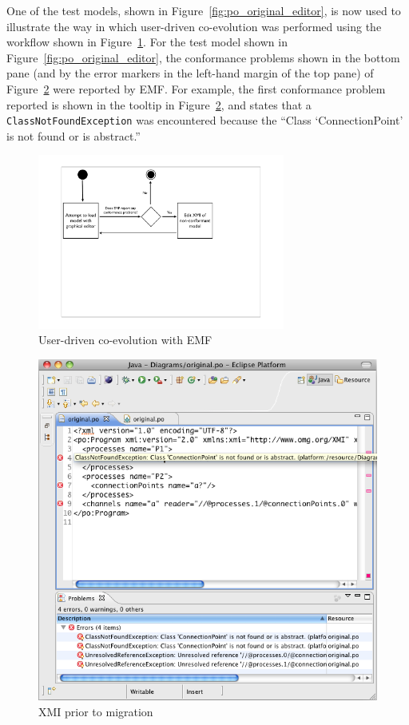 One of the test models, shown in Figure~\ref{fig:po_original_editor}, is now used to illustrate the way in which user-driven co-evolution was performed using the workflow shown in Figure~\ref{fig:emf_process}. For the test model shown in Figure~\ref{fig:po_original_editor}, the conformance problems shown in the bottom pane (and by the error markers in the left-hand margin of the top pane) of Figure~\ref{fig:po_original_xmi} were reported by EMF. For example, the first conformance problem reported is shown in the tooltip in Figure~\ref{fig:po_original_xmi}, and states that a \texttt{ClassNotFoundException} was encountered because the ``Class `ConnectionPoint' is not found or is abstract.''

\begin{figure}[htbp]
	\centering
		\includegraphics*[viewport=80 280 600 550,height=5.75cm]{6.Evaluation/images/user_driven/emf_process.pdf}
	\caption{User-driven co-evolution with EMF}
	\label{fig:emf_process}
\end{figure}

\begin{figure}[htbp]
	\centering
	\includegraphics[width=13.5cm]{6.Evaluation/images/user_driven/po_original_xmi.png}
	\caption{XMI prior to migration}
	\label{fig:po_original_xmi}
\end{figure}

